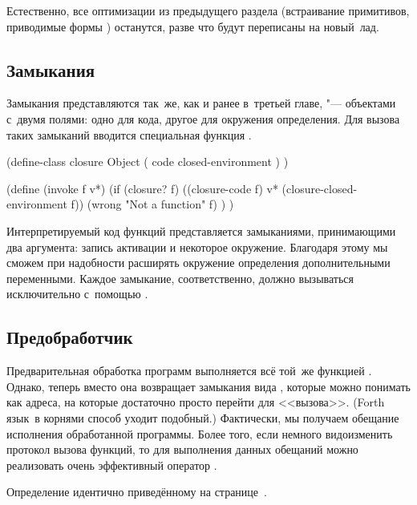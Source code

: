 Естественно, все оптимизации из предыдущего раздела (встраивание примитивов,
приводимые формы {\itd}) останутся, разве что будут переписаны на новый~лад.


\subsection{Замыкания}\label{fast/dilute/ssect:closures}

Замыкания представляются так~же, как и ранее в~третьей главе, "--- объектами
с~двумя полями: одно для кода, другое для окружения определения. Для вызова
таких замыканий вводится специальная функция .

\begin{code:lisp}
(define-class closure Object
  ( code
    closed-environment ) )

(define (invoke f v*)
  (if (closure? f)
      ((closure-code f) v* (closure-closed-environment f))
      (wrong "Not a function" f) ) )
\end{code:lisp}

Интерпретируемый код функций представляется замыканиями, принимающими два
аргумента: запись активации и некоторое окружение. Благодаря этому мы сможем при
надобности расширять окружение определения дополнительными переменными. Каждое
замыкание, соответственно, должно вызываться исключительно с~помощью
.


\subsection{Предобработчик}\label{fast/dilute/ssect:pretreater}

Предварительная обработка программ выполняется всё той~же функцией .
Однако, теперь вместо  она возвращает замыкания вида
, которые можно понимать как адреса, на которые достаточно
просто перейти для <<вызова>>. (Forth язык~в корнями способ уходит подобный.)
Фактически, мы получаем обещание исполнения обработанной программы. Более того,
если немного видоизменить протокол вызова функций, то для выполнения данных
обещаний можно реализовать очень эффективный оператор .

Определение  идентично приведённому
на странице~\pageref{fast/reject/src:meaning}.



